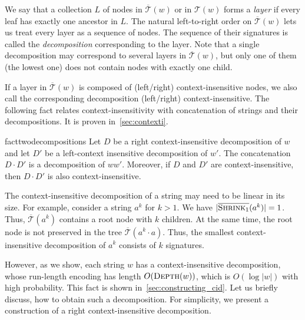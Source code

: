 \documentclass[a4paper]{article}
\theoremstyle{remark}
\newcommand{\depth}{\textsc{Depth}}
\newcommand{\cshrink}[1]{\ensuremath{\overline{\textsc{Shrink}_{#1}}}}
\newcommand{\str}{w}
\newcommand{\stree}{\mathcal{T}}
\newcommand{\ustree}{\mathcal{\overline{T}}}
\begin{document}
We say that a collection $L$ of nodes in $\ustree(w)$ or in $\stree(w)$ forms a \emph{layer} if every leaf has exactly one ancestor in $L$.
The natural left-to-right order on $\ustree(w)$ lets us treat every layer as a sequence of nodes.
The sequence of their signatures is called the \emph{decomposition} corresponding to the layer.
Note that a single decomposition may correspond to several layers in $\ustree(w)$, but only one of them (the lowest one) does not contain nodes with exactly one child.

If a layer in $\ustree(w)$ is composed of (left/right) context-insensitive nodes,
we also call the corresponding decomposition (left/right) context-insensitive.
The following fact relates context-insensitivity with concatenation of strings and their decompositions.
It is proven in~\cref{sec:contexti}.

\begin{restatable}{fact}{twodecompositions}\label{fact:two-decompositions}
Let $D$ be a right context-insensitive decomposition of $w$ and let $D'$ be a left-context insensitive decomposition of $w'$.
The concatenation $D\cdot D'$ is a decomposition of $w w'$. Moreover, if $D$ and $D'$ are context-insensitive, then $D\cdot D'$
is also context-insensitive.
\end{restatable}

The context-insensitive decomposition of a string may need to be linear in its size.
For example, consider a string $a^k$ for $k > 1$.
We have $|\cshrink{1}(a^k)| = 1$.
Thus, $\ustree(a^k)$ contains a root node with $k$ children.
At the same time, the root node is not preserved in the tree $\ustree(a^{k} \cdot a)$.
Thus, the smallest context-insensitive decomposition of $a^k$ consists of $k$ signatures.

However, as we show, each string $\str$ has a context-insensitive decomposition, whose run-length encoding has length $O(\depth(\str))$, which is $O(\log |\str|)$ with high probability.
This fact is shown in~\cref{sec:constructing_cid}.
Let us briefly discuss, how to obtain such a decomposition.
For simplicity, we present a construction of a right context-insensitive decomposition.
\end{document}
